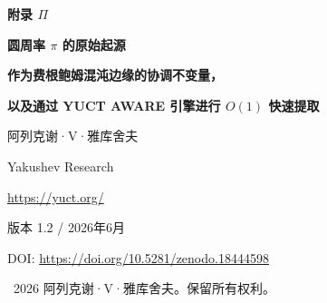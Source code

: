 \documentclass[12pt,a4paper]{article}
\newcommand{\Sodd}{S_{\mathrm{odd}}}
\newcommand{\Seven}{S_{\mathrm{even}}}
\newcommand{\df}{d_{\!f}}
\begin{document}
	
	\begin{titlepage}
		\centering
		\vspace*{0cm}
		
		{\Huge\bfseries 附录 $\Pi$\par}
		\vspace{0.5cm}
		{\Large\bfseries 圆周率 $\pi$ 的原始起源\par}
		\vspace{0.3cm}
		{\Large\bfseries 作为费根鲍姆混沌边缘的协调不变量，\par}
		\vspace{0.3cm}
		{\Large\bfseries 以及通过 YUCT AWARE 引擎进行 $O(1)$ 快速提取\par}
		\vspace{1.0cm}
		
		{\large 阿列克谢·V·雅库舍夫\par}
		\vspace{0.3cm}
		{\normalsize Yakushev Research\par}
		{\normalsize \url{https://yuct.org/}\par}
		
		\vspace{0.5cm}
		{\normalsize 版本 1.2 / 2026年6月\par}
		\vspace{0.3cm}
		{\normalsize DOI: \url{https://doi.org/10.5281/zenodo.18444598}\par}
		
		\vfill
		
		\begin{abstract}
			\noindent
			几何常数 $\pi$ 传统上被视为周长与直径的超越比。在雅库舍夫统一协调理论（YUCT）框架中，我们证明 $\pi$ 是一个确定性拓扑不变量，它源于真空格的刚性代数环（$\Sodd=6/5$, $\Seven=4/5$）与混沌起始处的费根鲍姆周期倍增级联的相互作用。关系式 $2\alpha^2 = \pi\delta$（其中 $\alpha\approx2.5029$, $\delta\approx4.6692$ 是费根鲍姆常数）揭示 $\pi$ 是相位同步系数，它使三维协调网络（$\df=3$）免于混沌退化。代数近似 $\pi \approx \Sodd\cdot\varphi^2$（$\varphi$ 为黄金比例）给出基本偏差 $\Delta\pi \approx 4.8\times10^{-5}$，这是空间的离散量子化步长，而非舍入误差。$\pi$ 在波和涡旋现象中的普遍出现，是支配素数分布的相同符号门机制的直接结果。
			
			我们提出一个完整的非计算导航引擎 \texttt{yuct\_constants.py v4.0}，它同时提取静态和动态 $\pi$、精细结构常数、通过相位门机制的 $n$ 个素数候选、分形临界点以及生物扭转比。该引擎在 $\sim 255\ \mu\text{s}$ 内执行，动态内存为零字节，完美展示了 $O(1)$ 提取范式。每个值直接从代数环获得，无需迭代，表明自然界的基本常数不是被计算出来的，而是从真空的刚性协调格中 \emph{读取} 出来的。
		\end{abstract}
		
		\vspace{0.5cm}
		\textcopyright\ 2026 阿列克谢·V·雅库舍夫。保留所有权利。
	\end{titlepage}
	
\end{document}
